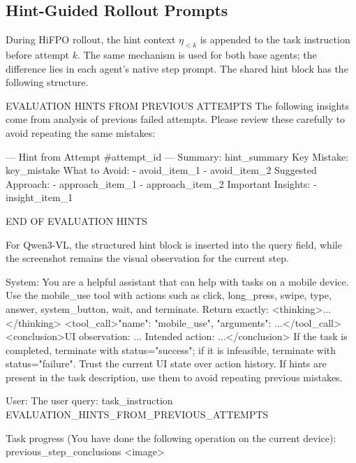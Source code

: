 \documentclass{llmxive}
\providecommand{\hifpo}{HiFPO\xspace}
\begin{document}
\subsection{Hint-Guided Rollout Prompts}
\label{sec:rollout_prompts}

During \hifpo rollout, the hint context $\eta_{<k}$ is appended to the task instruction before attempt $k$. The same mechanism is used for both base agents; the difference lies in each agent's native step prompt. The shared hint block has the following structure.

\begin{promptlistingbox}
EVALUATION HINTS FROM PREVIOUS ATTEMPTS
The following insights come from analysis of previous failed attempts.
Please review these carefully to avoid repeating the same mistakes:

--- Hint from Attempt #{attempt_id} ---
Summary: {hint_summary}
Key Mistake: {key_mistake}
What to Avoid:
  - {avoid_item_1}
  - {avoid_item_2}
Suggested Approach:
  - {approach_item_1}
  - {approach_item_2}
Important Insights:
  - {insight_item_1}

END OF EVALUATION HINTS
\end{promptlistingbox}

For Qwen3-VL, the structured hint block is inserted into the query field, while the screenshot remains the visual observation for the current step.

\begin{promptlistingbox}
System:
You are a helpful assistant that can help with tasks on a mobile device.
Use the mobile_use tool with actions such as click, long_press, swipe,
type, answer, system_button, wait, and terminate.
Return exactly:
  <thinking>...</thinking>
  <tool_call>{"name": "mobile_use", "arguments": {...}}</tool_call>
  <conclusion>UI observation: ... Intended action: ...</conclusion>
If the task is completed, terminate with status="success"; if it is
infeasible, terminate with status="failure". Trust the current UI state
over action history. If hints are present in the task description, use
them to avoid repeating previous mistakes.

User:
The user query: {task_instruction}
{EVALUATION_HINTS_FROM_PREVIOUS_ATTEMPTS}

Task progress (You have done the following operation on the current
device):
{previous_step_conclusions}
<image>
\end{promptlistingbox}
\end{document}
